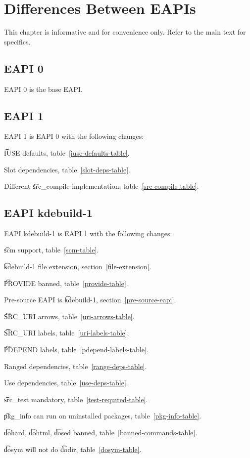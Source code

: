 \chapter{Differences Between EAPIs}

\note This chapter is informative and for convenience only. Refer to the main text for specifics.

\section*{EAPI 0}

EAPI 0 is the base EAPI.

\section*{EAPI 1}

EAPI 1 is EAPI 0 with the following changes:

\begin{compactitem}
\item \t{IUSE} defaults, table~\ref{iuse-defaults-table}.
\item Slot dependencies, table~\ref{slot-deps-table}.
\item Different \t{src\_compile} implementation, table~\ref{src-compile-table}.
\end{compactitem}

\IFKDEBUILDELSE
{
    \section*{EAPI kdebuild-1}

    EAPI kdebuild-1 is EAPI 1 with the following changes:

    \begin{compactitem}
    \item \t{scm} support, table~\ref{scm-table}.
    \item \t{kdebuild-1} file extension, section~\ref{file-extension}.
    \item \t{PROVIDE} banned, table~\ref{provide-table}.
    \item Pre-source EAPI is \t{kdebuild-1}, section~\ref{pre-source-eapi}.
    \item \t{SRC\_URI} arrows, table~\ref{uri-arrows-table}.
    \item \t{SRC\_URI} labels, table~\ref{uri-labels-table}.
    \item \t{PDEPEND} labels, table~\ref{pdepend-labels-table}.
    \item Ranged dependencies, table~\ref{range-deps-table}.
    \item Use dependencies, table~\ref{use-deps-table}.
    \item \t{src\_test} mandatory, table~\ref{test-required-table}.
    \item \t{pkg\_info} can run on uninstalled packages, table~\ref{pkg-info-table}.
    \item \t{dohard}, \t{dohtml}, \t{dosed} banned, table~\ref{banned-commands-table}.
    \item \t{dosym} will not do \t{dodir}, table~\ref{dosym-table}.
    \end{compactitem}
}{
}

